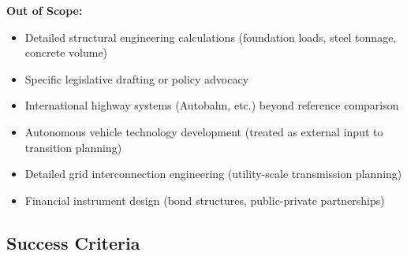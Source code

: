 \documentclass[11pt,letterpaper]{article}
\begin{document}
\textbf{Out of Scope:}
\begin{itemize}[leftmargin=2em]
  \item Detailed structural engineering calculations (foundation loads, steel tonnage, concrete volume)
  \item Specific legislative drafting or policy advocacy
  \item International highway systems (Autobahn, etc.) beyond reference comparison
  \item Autonomous vehicle technology development (treated as external input to transition planning)
  \item Detailed grid interconnection engineering (utility-scale transmission planning)
  \item Financial instrument design (bond structures, public-private partnerships)
\end{itemize}

\subsection{Success Criteria}
\end{document}

